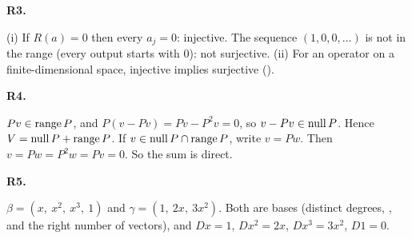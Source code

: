 \documentclass[10pt]{scrartcl}
\begin{document}
\begin{prob}\textbf{R3.}\par{}
(i) If $R(a)=0$ then every $a_j=0$: injective. The sequence $(1,0,0,\dots)$ is not in the range (every output starts with $0$): not surjective. (ii) For an operator on a finite-dimensional space, injective implies surjective ().
\end{prob}

\begin{prob}\textbf{R4.}\par{}
\begin{steps}
  \ii $Pv\in\operatorname{range} P$, and $P(v-Pv)=Pv-P^2v=0$, so $v-Pv\in\operatorname{null} P$. Hence $V=\operatorname{null} P+\operatorname{range} P$.
  \ii If $v\in\operatorname{null} P\cap\operatorname{range} P$, write $v=Pw$. Then $v=Pw=P^2w=Pv=0$. So the sum is direct.
\end{steps}
\end{prob}

\begin{prob}\textbf{R5.}\par{}
$\beta=(x,\ x^2,\ x^3,\ 1)$ and $\gamma=(1,\ 2x,\ 3x^2)$. Both are bases (distinct degrees, , and the right number of vectors), and $Dx=1$, $Dx^2=2x$, $Dx^3=3x^2$, $D1=0$.
\end{prob}
\end{document}
